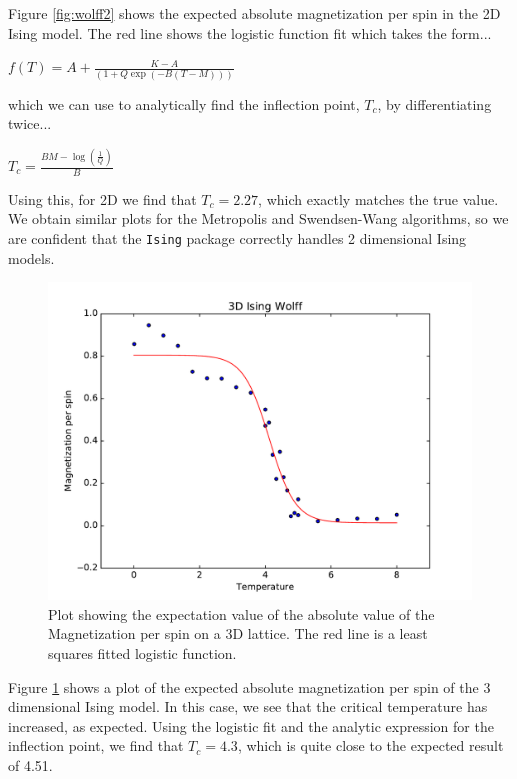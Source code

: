 \documentclass[a4paper]{article}
\begin{document}
Figure \ref{fig:wolff2} shows the expected absolute magnetization per spin in the 2D Ising model. The red line shows the logistic function fit which takes the form...
\begin{center}
	$f(T)=A+\frac{K-A}{(1+Q\exp(-B(T-M)))}$
\end{center}
which we can use to analytically find the inflection point, $T_{c}$, by differentiating twice...
\begin{center}
	$T_{c}=\frac{BM-\log\left(\frac{1}{Q}\right)}{B}$
\end{center}

Using this, for 2D we find that $T_{c}=2.27$, which exactly matches the true value. We obtain similar plots for the Metropolis and Swendsen-Wang algorithms, so we are confident that the \texttt{Ising} package correctly handles 2 dimensional Ising models.

\begin{figure}[htb!]
	\centering \includegraphics[width=\linewidth]{3D_Wolff.pdf}
	\caption{Plot showing the expectation value of the absolute value of the Magnetization per spin on a 3D lattice. The red line is a least squares fitted logistic function.}
	\label{fig:wolff3}
\end{figure}

Figure \ref{fig:wolff3} shows a plot of the expected absolute magnetization per spin of the 3 dimensional Ising model. In this case, we see that the critical temperature has increased, as expected. Using the logistic fit and the analytic expression for the inflection point, we find that $T_{c}=4.3$, which is quite close to the expected result of 4.51. 
\end{document}
